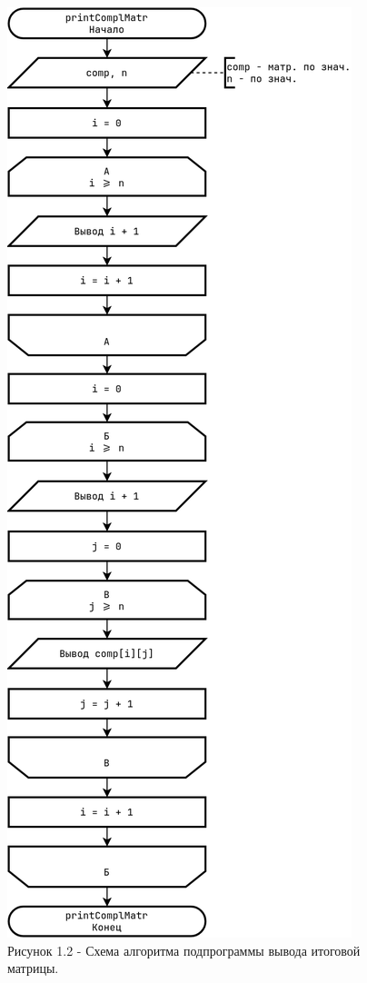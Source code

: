 \documentclass[oneside,a4paper,14pt]{extarticle}
\begin{document}
\clearpage
\begin{figure}[H]
	\centering
	\includegraphics[height=0.9\textheight]{pics/flowchart2.png}
	\caption*{Рисунок 1.2 - Схема алгоритма подпрограммы вывода итоговой матрицы.}
\end{figure}
\end{document}
